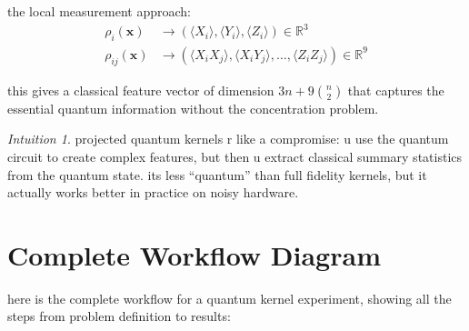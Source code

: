 \documentclass[11pt,a4paper]{article}
\theoremstyle{definition}
\theoremstyle{remark}
\newtheorem*{intuition}{Intuition}
\begin{document}
the local measurement approach:
\begin{align}
\rho_i(\mathbf{x}) &\to (\langle X_i \rangle, \langle Y_i \rangle, \langle Z_i \rangle) \in \mathbb{R}^3 \\
\rho_{ij}(\mathbf{x}) &\to (\langle X_i X_j \rangle, \langle X_i Y_j \rangle, \ldots, \langle Z_i Z_j \rangle) \in \mathbb{R}^9
\end{align}

this gives a classical feature vector of dimension $3n + 9\binom{n}{2}$ that captures the essential quantum information without the concentration problem.

\begin{intuition}
projected quantum kernels r like a compromise: u use the quantum circuit to create complex features, but then u extract classical summary statistics from the quantum state. its less ``quantum'' than full fidelity kernels, but it actually works better in practice on noisy hardware.
\end{intuition}

\section{Complete Workflow Diagram}

here is the complete workflow for a quantum kernel experiment, showing all the steps from problem definition to results:
\end{document}
